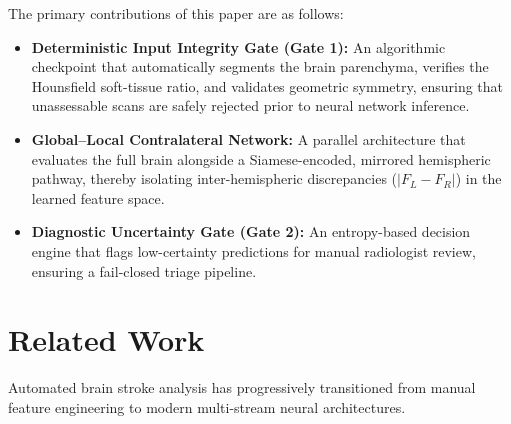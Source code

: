 \documentclass[conference]{IEEEtran}
\begin{document}
The primary contributions of this paper are as follows:
\begin{itemize}
    \item \textbf{Deterministic Input Integrity Gate (Gate 1):} An algorithmic checkpoint that automatically segments the brain parenchyma, verifies the Hounsfield soft-tissue ratio, and validates geometric symmetry, ensuring that unassessable scans are safely rejected prior to neural network inference.
    \item \textbf{Global--Local Contralateral Network:} A parallel architecture that evaluates the full brain alongside a Siamese-encoded, mirrored hemispheric pathway, thereby isolating inter-hemispheric discrepancies ($|F_L - F_R|$) in the learned feature space.
    \item \textbf{Diagnostic Uncertainty Gate (Gate 2):} An entropy-based decision engine that flags low-certainty predictions for manual radiologist review, ensuring a fail-closed triage pipeline.
\end{itemize}

\section{Related Work}
Automated brain stroke analysis has progressively transitioned from manual feature engineering to modern multi-stream neural architectures.
\end{document}
